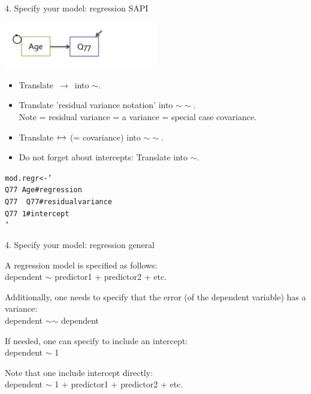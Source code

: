 \documentclass[10pt]{beamer}\usepackage[]{graphicx}\usepackage[]{xcolor}
\makeatletter
\newcommand{\hlstr}[1]{\textcolor[rgb]{0.192,0.494,0.8}{#1}}%
\newcommand{\hlstd}[1]{\textcolor[rgb]{0.345,0.345,0.345}{#1}}%
\newcommand{\hlkwb}[1]{\textcolor[rgb]{0.69,0.353,0.396}{#1}}%
\newenvironment{kframe}{%
 \def\at@end@of@kframe{}%
 \ifinner\ifhmode%
  \def\at@end@of@kframe{\end{minipage}}%
  \begin{minipage}{\columnwidth}%
 \fi\fi%
 \def\FrameCommand##1{\hskip\@totalleftmargin \hskip-\fboxsep
 \colorbox{shadecolor}{##1}\hskip-\fboxsep
     \hskip-\linewidth \hskip-\@totalleftmargin \hskip\columnwidth}%
 \MakeFramed {\advance\hsize-\width
   \@totalleftmargin\z@ \linewidth\hsize
   \@setminipage}}%
 {\par\unskip\endMakeFramed%
 \at@end@of@kframe}
\newenvironment{knitrout}{}{} %
\makeatother
\begin{document}
\begin{frame}[fragile]{4. Specify your model: regression SAPI}

\includegraphics[height=2cm, keepaspectratio=T] {RegressionModel.png}

\begin{itemize}
  \item Translate $\,\to\,$ into $\sim$.
  \item Translate 'residual variance notation' into $\sim\sim$.\\
  Note = residual variance = a variance = special case covariance.
  \item Translate $\xleftrightarrow{}$ (= covariance) into $\sim\sim$.
  \item Do not forget about intercepts: Translate into $\sim$.
\end{itemize}

\begin{knitrout}
\color{fgcolor}\begin{kframe}
\begin{alltt}
\hlstd{mod.regr} \hlkwb{<-} \hlstr{'
  Q77 ~ Age  # regression
  Q77 ~~ Q77 # residual variance
  Q77 ~ 1    # intercept
'}
\end{alltt}
\end{kframe}
\end{knitrout}

\end{frame}
%
\begin{frame}[fragile]{4. Specify your model: regression general}

A regression model is specified as follows: \\
dependent $\sim$ predictor1 + predictor2 + etc.\\

\vspace{5mm}

Additionally, one needs to specify that the error (of the dependent variable) has a variance:\\
dependent $\sim$$\sim$ dependent\\ 

\vspace{5mm}

If needed, one can specify to include an intercept:\\
dependent $\sim$ 1\\

\vspace{5mm}

Note that one include intercept directly: \\
dependent $\sim$ 1 + predictor1 + predictor2 + etc.


\end{frame}
\end{document}
